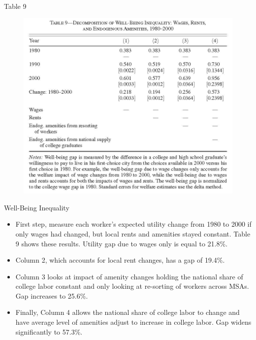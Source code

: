 \documentclass[aspectratio=169]{beamer}
\begin{document}

\begin{frame}{Table 9}

\begin{figure}
    \centering
    \includegraphics[scale=0.7]{DiamondTable9.jpg}
    \label{fig:Table9}
\end{figure}
    
\end{frame}


\begin{frame}{Well-Being Inequality}

\begin{itemize}
    \item<1->  First step, measure each worker’s expected utility change from 1980 to 2000 if only wages had changed, but local rents and amenities stayed constant.  Table 9 shows these results.  Utility gap due to wages only is equal to 21.8\%.
    \item<2-> Column 2, which accounts for local rent changes, has a gap of 19.4\%.
    \item<3-> Column 3 looks at impact of amenity changes holding the national share of college labor constant and only looking at re-sorting of workers across MSAs.  Gap increases to 25.6\%.
    \item<4->  Finally, Column 4 allows the national share of college labor to change and have average level of amenities adjust to increase in college labor.  Gap widens significantly to 57.3\%.
\end{itemize}
    
\end{frame}
\end{document}
